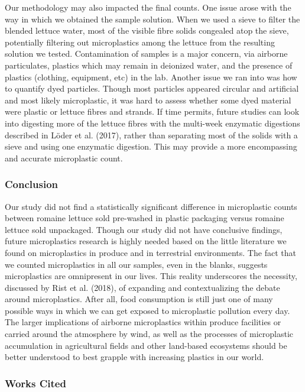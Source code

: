 \documentclass[]{article}
\begin{document}
Our methodology may also impacted the final counts. One issue arose with
the way in which we obtained the sample solution. When we used a sieve
to filter the blended lettuce water, most of the visible fibre solids
congealed atop the sieve, potentially filtering out microplastics among
the lettuce from the resulting solution we tested. Contamination of
samples is a major concern, via airborne particulates, plastics which
may remain in deionized water, and the presence of plastics (clothing,
equipment, etc) in the lab. Another issue we ran into was how to
quantify dyed particles. Though most particles appeared circular and
artificial and most likely microplastic, it was hard to assess whether
some dyed material were plastic or lettuce fibres and strands. If time
permits, future studies can look into digesting more of the lettuce
fibres with the multi-week enzymatic digestions described in Löder et
al. (2017), rather than separating most of the solids with a sieve and
using one enzymatic digestion. This may provide a more encompassing and
accurate microplastic count.

\hypertarget{conclusion}{%
\subsubsection{Conclusion}\label{conclusion}}

Our study did not find a statistically significant difference in
microplastic counts between romaine lettuce sold pre-washed in plastic
packaging versus romaine lettuce sold unpackaged. Though our study did
not have conclusive findings, future microplastics research is highly
needed based on the little literature we found on microplastics in
produce and in terrestrial environments. The fact that we counted
microplastics in all our samples, even in the blanks, suggests
microplastics are omnipresent in our lives. This reality underscores the
necessity, discussed by Rist et al. (2018), of expanding and
contextualizing the debate around microplastics. After all, food
consumption is still just one of many possible ways in which we can get
exposed to microplastic pollution every day. The larger implications of
airborne microplastics within produce facilities or carried around the
atmosphere by wind, as well as the processes of microplastic
accumulation in agricultural fields and other land-based ecosystems
should be better understood to best grapple with increasing plastics in
our world.

\hypertarget{works-cited}{%
\subsubsection{Works Cited}\label{works-cited}}
\end{document}
